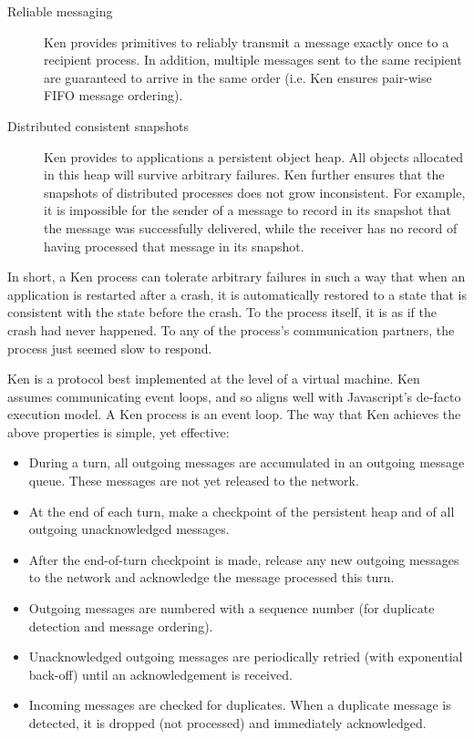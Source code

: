 \documentclass{llncs}
\begin{document}
\begin{description}
  \item[Reliable messaging] Ken provides primitives to reliably transmit a message exactly once to a recipient process. In addition, multiple messages sent to the same recipient are guaranteed to arrive in the same order (i.e. Ken ensures pair-wise FIFO message ordering).
  \item[Distributed consistent snapshots] Ken provides to applications a persistent object heap. All objects allocated in this heap will survive arbitrary failures. Ken further ensures that the snapshots of distributed processes does not grow inconsistent. For example, it is impossible for the sender of a message to record in its snapshot that the message was successfully delivered, while the receiver has no record of having processed that message in its snapshot.
\end{description}

In short, a Ken process can tolerate arbitrary failures in such a way that when an application is restarted after a crash, it is automatically restored to a state that is consistent with the state before the crash. To the process itself, it is as if the crash had never happened. To any of the process's communication partners, the process just seemed slow to respond.

Ken is a protocol best implemented at the level of a virtual machine. Ken assumes communicating event loops, and so aligns well with Javascript's de-facto execution model. A Ken process is an event loop. The way that Ken achieves the above properties is simple, yet effective:

\begin{itemize}
  \item During a turn, all outgoing messages are accumulated in an outgoing message queue. These messages are not yet released to the network.
  \item At the end of each turn, make a checkpoint of the persistent heap and of all outgoing unacknowledged messages.
  \item After the end-of-turn checkpoint is made, release any new outgoing messages to the network and acknowledge the message processed this turn.
  \item Outgoing messages are numbered with a sequence number (for duplicate detection and message ordering).
  \item Unacknowledged outgoing messages are periodically retried (with exponential back-off) until an acknowledgement is received.
  \item Incoming messages are checked for duplicates. When a duplicate message is detected, it is dropped (not processed) and immediately acknowledged.
\end{itemize}
\end{document}
